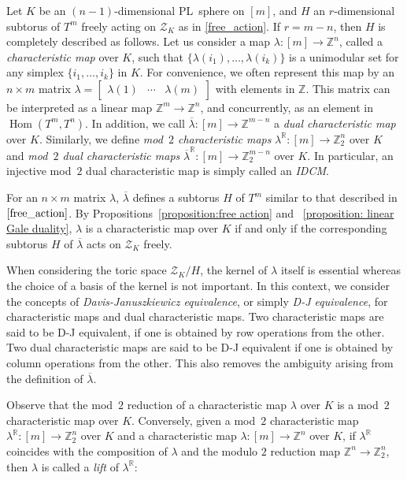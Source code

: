 \documentclass[11pt]{amsart}
\theoremstyle{plain}
\numberwithin{equation}{section}
\theoremstyle{definition}
\newcommand{\R}{\mathbb{R}}
\newcommand{\Z}{\mathbb{Z}}
\newcommand{\cZ}{\mathcal{Z}}
\DeclareMathOperator{\Hom}{Hom}
\begin{document}
Let $K$ be an $(n-1)$-dimensional PL~sphere on $[m]$, and $H$ an \mbox{$r$-dimensional} subtorus of $T^m$ freely acting on $\cZ_K$ as in \eqref{free_action}.
If $r = m-n$, then $H$ is completely described as follows. 
Let us consider a map $\lambda \colon [m] \to \Z^n$, called a \emph{characteristic map} over $K$, such that $\{ \lambda(i_1), \ldots, \lambda(i_k) \}$ is a unimodular set for any simplex $\{i_1, \ldots, i_k\}$ in $K$.
For convenience, we often represent this map by an $n \times m$ matrix
$\lambda=
\begin{bmatrix}
    \lambda(1) & \cdots & \lambda(m)
\end{bmatrix}
$
with elements in $\Z$.
This matrix can be interpreted as a linear map $\Z^m \to \Z^n$, and concurrently, as an element in $\Hom(T^m, T^n)$.
In addition, we call $\overline{\lambda} \colon [m] \to \Z^{m-n}$ a \emph{dual characteristic map} over $K$.
Similarly, we define \emph{mod~$2$ characteristic maps} $\lambda^\R \colon [m] \to \Z_2^n$ over $K$ and \emph{mod~$2$ dual characteristic maps} $\overline{\lambda}^\R \colon [m] \to \Z_2^{m-n}$ over $K$.
In particular, an injective mod~$2$ dual characteristic map is simply called an \emph{IDCM}.


For an $n \times m$ matrix $\lambda$, $\overline{\lambda}$ defines a subtorus $H$ of $T^m$ similar to that described in $\eqref{free_action}$.
By Propositions~\ref{proposition:free action} and ~\ref{proposition: linear Gale duality}, $\lambda$ is a characteristic map over $K$ if and only if the corresponding subtorus $H$ of $\overline{\lambda}$ acts on $\cZ_K$ freely.

When considering the toric space $\cZ_K / H$, the kernel of $\lambda$ itself is essential whereas the choice of a basis of the kernel is not important.
In this context, we consider the concepts of \emph{Davis-Januszkiewicz equivalence}, or simply \emph{D-J equivalence}, for characteristic maps and dual characteristic maps.
Two characteristic maps are said to be D-J equivalent, if one is obtained by row operations from the other.
Two dual characteristic maps are said to be D-J equivalent if one is obtained by column operations from the other.
This also removes the ambiguity arising from the definition of $\overline{\lambda}$.

Observe that the mod~$2$ reduction of a characteristic map $\lambda$ over $K$ is a mod~$2$ characteristic map over $K$.
Conversely, given a mod~$2$ characteristic map $\lambda^\R \colon [m] \to \Z_2^n$ over $K$ and a characteristic map $\lambda \colon [m] \to \Z^n$ over $K$, if $\lambda^\R$ coincides with the composition of $\lambda$ and the modulo $2$ reduction map $\Z^n \to \Z_2^n$, then $\lambda$ is called a \emph{lift} of $\lambda^\R$:
\end{document}
